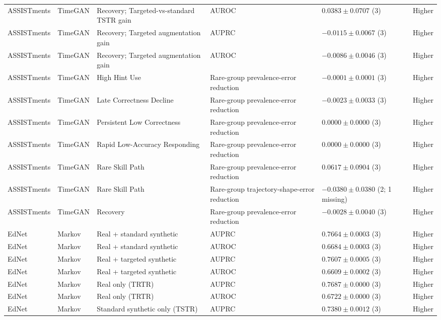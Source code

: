 \begin{longtable}{@{}p{2.25cm}p{2.05cm}p{4.7cm}p{5.0cm}p{2.6cm}p{1.25cm}@{}}
ASSISTments & TimeGAN & Recovery; Targeted-vs-standard TSTR gain & AUROC & $0.0383 \mathbin{\pm} 0.0707$ (3) & Higher \\
ASSISTments & TimeGAN & Recovery; Targeted augmentation gain & AUPRC & $-0.0115 \mathbin{\pm} 0.0067$ (3) & Higher \\
ASSISTments & TimeGAN & Recovery; Targeted augmentation gain & AUROC & $-0.0086 \mathbin{\pm} 0.0046$ (3) & Higher \\
ASSISTments & TimeGAN & High Hint Use & Rare-group prevalence-error reduction & $-0.0001 \mathbin{\pm} 0.0001$ (3) & Higher \\
ASSISTments & TimeGAN & Late Correctness Decline & Rare-group prevalence-error reduction & $-0.0023 \mathbin{\pm} 0.0033$ (3) & Higher \\
ASSISTments & TimeGAN & Persistent Low Correctness & Rare-group prevalence-error reduction & $0.0000 \mathbin{\pm} 0.0000$ (3) & Higher \\
ASSISTments & TimeGAN & Rapid Low-Accuracy Responding & Rare-group prevalence-error reduction & $0.0000 \mathbin{\pm} 0.0000$ (3) & Higher \\
ASSISTments & TimeGAN & Rare Skill Path & Rare-group prevalence-error reduction & $0.0617 \mathbin{\pm} 0.0904$ (3) & Higher \\
ASSISTments & TimeGAN & Rare Skill Path & Rare-group trajectory-shape-error reduction & $-0.0380 \mathbin{\pm} 0.0380$ (2; 1 missing) & Higher \\
ASSISTments & TimeGAN & Recovery & Rare-group prevalence-error reduction & $-0.0028 \mathbin{\pm} 0.0040$ (3) & Higher \\
EdNet & Markov & Real + standard synthetic & AUPRC & $0.7664 \mathbin{\pm} 0.0003$ (3) & Higher \\
EdNet & Markov & Real + standard synthetic & AUROC & $0.6684 \mathbin{\pm} 0.0003$ (3) & Higher \\
EdNet & Markov & Real + targeted synthetic & AUPRC & $0.7607 \mathbin{\pm} 0.0005$ (3) & Higher \\
EdNet & Markov & Real + targeted synthetic & AUROC & $0.6609 \mathbin{\pm} 0.0002$ (3) & Higher \\
EdNet & Markov & Real only (TRTR) & AUPRC & $0.7687 \mathbin{\pm} 0.0000$ (3) & Higher \\
EdNet & Markov & Real only (TRTR) & AUROC & $0.6722 \mathbin{\pm} 0.0000$ (3) & Higher \\
EdNet & Markov & Standard synthetic only (TSTR) & AUPRC & $0.7380 \mathbin{\pm} 0.0012$ (3) & Higher \\

\end{longtable}
